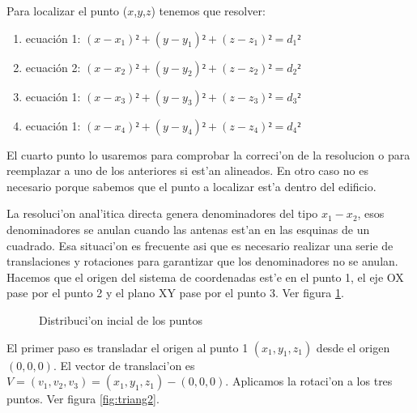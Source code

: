Para localizar el punto ($x$,$y$,$z$) tenemos que resolver:
\begin{enumerate}
	\item ecuación 1: $(x - x_1)² + (y - y_1)² +(z - z_1)² = d_1² $
	\item ecuación 2: $(x - x_2)² + (y - y_2)² +(z - z_2)² = d_2² $
	\item ecuación 1: $(x - x_3)² + (y - y_3)² +(z - z_3)² = d_3² $
	\item ecuación 1: $(x - x_4)² + (y - y_4)² +(z - z_4)² = d_4² $
\end{enumerate}

El cuarto punto lo usaremos para comprobar la correci'on de la resolucion o para reemplazar a uno de los anteriores si est'an alineados. En otro caso no es necesario porque sabemos que el punto a localizar est'a dentro del edificio.\bigskip\newline

La resoluci'on anal'itica directa genera denominadores del tipo $x_1 - x_2$, esos denominadores se anulan cuando las antenas est'an en las esquinas de un cuadrado. Esa situaci'on es frecuente asi que es necesario realizar una serie de translaciones y rotaciones para garantizar que los denominadores no se anulan. Hacemos que el origen del sistema de coordenadas est'e en el punto 1, el eje OX pase por el punto 2 y el plano XY pase por el punto 3.  Ver figura \ref{fig:triang1}. 

\begin{figure}[h!]
	\begin{center}
     	\end{center}
    	\caption{Distribuci'on incial de los puntos}\label{fig:triang1}
\end{figure}


El primer paso es transladar el origen al punto 1 $(x_1,y_1,z_1)$ desde el origen $(0,0,0)$. El vector de translaci'on es $V = (v_1,v_2,v_3) = (x_1,y_1,z_1) - (0, 0, 0)$. Aplicamos la rotaci'on a los tres puntos. Ver figura \ref{fig:triang2}.

